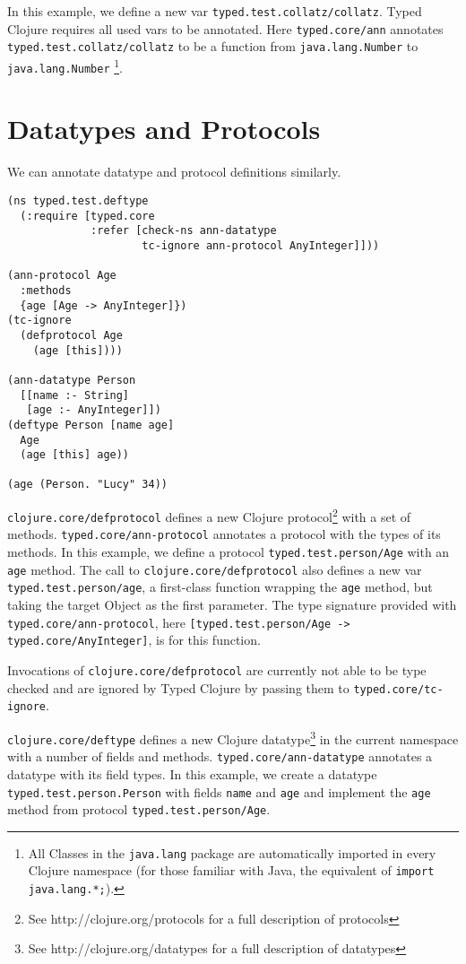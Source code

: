 \documentclass{cshonours}
\begin{document}
In this example, we define a new var \lstinline|typed.test.collatz/collatz|. Typed Clojure requires all 
used vars to be annotated. Here \lstinline|typed.core/ann| annotates \lstinline|typed.test.collatz/collatz|
to be a function from \lstinline{java.lang.Number} to 
\lstinline{java.lang.Number}
\footnote{All Classes in the \lstinline|java.lang| package
are automatically imported in every Clojure namespace (for those familiar with Java, the equivalent of \lstinline|import java.lang.*;|).}.

\section{Datatypes and Protocols}

We can annotate datatype and protocol definitions similarly.

\begin{lstlisting}
(ns typed.test.deftype
  (:require [typed.core 
             :refer [check-ns ann-datatype
                     tc-ignore ann-protocol AnyInteger]]))

(ann-protocol Age 
  :methods
  {age [Age -> AnyInteger]})
(tc-ignore
  (defprotocol Age
    (age [this])))

(ann-datatype Person 
  [[name :- String]
   [age :- AnyInteger]])
(deftype Person [name age]
  Age
  (age [this] age))

(age (Person. "Lucy" 34))
\end{lstlisting}

\lstinline|clojure.core/defprotocol| defines a new Clojure protocol\footnote{See http://clojure.org/protocols for a full description of protocols}
with a set of methods. \lstinline|typed.core/ann-protocol| annotates a protocol with the types of its methods.
In this example, we define a protocol \lstinline|typed.test.person/Age| with an \lstinline|age| method.
The call to \lstinline|clojure.core/defprotocol| also defines a new var \lstinline|typed.test.person/age|, a first-class function
wrapping the \lstinline|age| method, but taking the target Object as the first parameter. The
type signature provided with \lstinline|typed.core/ann-protocol|, here \lstinline|[typed.test.person/Age -> typed.core/AnyInteger]|, 
is for this function.

Invocations of \lstinline|clojure.core/defprotocol| are currently not able to be type checked
and are ignored by Typed Clojure by passing them to \lstinline|typed.core/tc-ignore|.

\lstinline|clojure.core/deftype|
defines a new Clojure datatype\footnote{See http://clojure.org/datatypes for a full description of datatypes}
in the current namespace with a number of fields and methods. 
\lstinline|typed.core/ann-datatype| annotates a datatype with its field types.
In this example, we create a datatype \lstinline|typed.test.person.Person|
with fields \lstinline|name| and \lstinline|age| and implement the \lstinline|age|
method from protocol \lstinline|typed.test.person/Age|.
\end{document}
